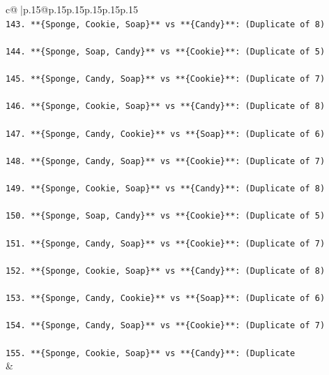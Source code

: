 \documentclass{article}
\begin{document}
{\begin{supertabular}{c@{$\;$}|p{.15\linewidth}@{}p{.15\linewidth}p{.15\linewidth}p{.15\linewidth}p{.15\linewidth}p{.15\linewidth}}
{{{\\ 
\texttt{143. **\{Sponge, Cookie, Soap\}** vs **\{Candy\}**: (Duplicate of 8)} \\
\\ 
\texttt{144. **\{Sponge, Soap, Candy\}** vs **\{Cookie\}**: (Duplicate of 5)} \\
\\ 
\texttt{145. **\{Sponge, Candy, Soap\}** vs **\{Cookie\}**: (Duplicate of 7)} \\
\\ 
\texttt{146. **\{Sponge, Cookie, Soap\}** vs **\{Candy\}**: (Duplicate of 8)} \\
\\ 
\texttt{147. **\{Sponge, Candy, Cookie\}** vs **\{Soap\}**: (Duplicate of 6)} \\
\\ 
\texttt{148. **\{Sponge, Candy, Soap\}** vs **\{Cookie\}**: (Duplicate of 7)} \\
\\ 
\texttt{149. **\{Sponge, Cookie, Soap\}** vs **\{Candy\}**: (Duplicate of 8)} \\
\\ 
\texttt{150. **\{Sponge, Soap, Candy\}** vs **\{Cookie\}**: (Duplicate of 5)} \\
\\ 
\texttt{151. **\{Sponge, Candy, Soap\}** vs **\{Cookie\}**: (Duplicate of 7)} \\
\\ 
\texttt{152. **\{Sponge, Cookie, Soap\}** vs **\{Candy\}**: (Duplicate of 8)} \\
\\ 
\texttt{153. **\{Sponge, Candy, Cookie\}** vs **\{Soap\}**: (Duplicate of 6)} \\
\\ 
\texttt{154. **\{Sponge, Candy, Soap\}** vs **\{Cookie\}**: (Duplicate of 7)} \\
\\ 
\texttt{155. **\{Sponge, Cookie, Soap\}** vs **\{Candy\}**: (Duplicate} \\
            }
        }
    }
    & \\ \\


\end{supertabular}}
\end{document}
